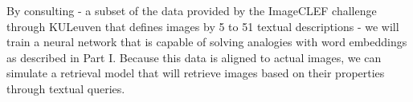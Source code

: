 By consulting - a subset of the data provided by the ImageCLEF challenge through KULeuven \cite{imageclef} that defines images by 5 to 51 textual descriptions - we will train a neural network that is capable of solving analogies with word embeddings as described in Part I. Because this data is aligned to actual images, we can simulate a retrieval model that will retrieve images based on their properties through textual queries.